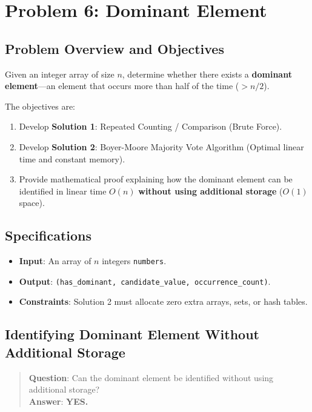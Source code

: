 \section{Problem 6: Dominant Element}

\subsection{Problem Overview and Objectives}
Given an integer array of size $n$, determine whether there exists a \textbf{dominant element}—an element that occurs more than half of the time ($> n / 2$).

The objectives are:
\begin{enumerate}
    \item Develop \textbf{Solution 1}: Repeated Counting / Comparison (Brute Force).
    \item Develop \textbf{Solution 2}: Boyer-Moore Majority Vote Algorithm (Optimal linear time and constant memory).
    \item Provide mathematical proof explaining how the dominant element can be identified in linear time $O(n)$ \textbf{without using additional storage} ($O(1)$ space).
\end{enumerate}

\subsection{Specifications}
\begin{itemize}
    \item \textbf{Input}: An array of $n$ integers \texttt{numbers}.
    \item \textbf{Output}: \texttt{(has\_dominant, candidate\_value, occurrence\_count)}.
    \item \textbf{Constraints}: Solution 2 must allocate zero extra arrays, sets, or hash tables.
\end{itemize}

\subsection{Identifying Dominant Element Without Additional Storage}
\begin{quote}
\textbf{Question}: Can the dominant element be identified without using additional storage? \\
\textbf{Answer}: \textbf{YES.}
\end{quote}

